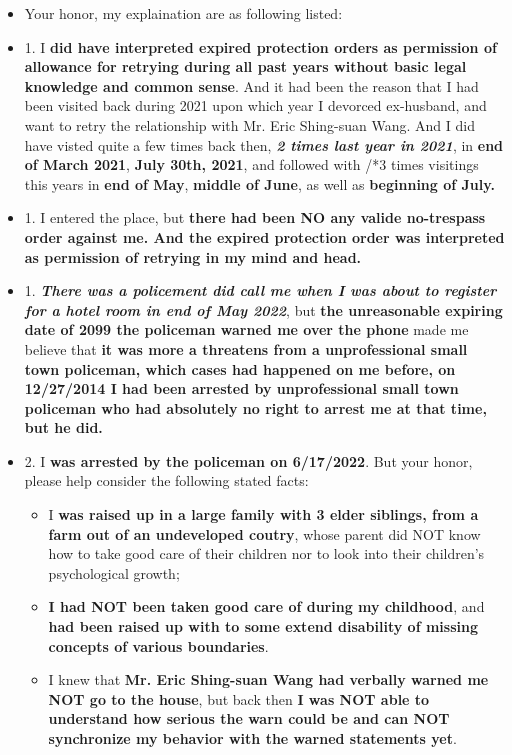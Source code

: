 \documentclass[9pt, b5paper]{article}
\begin{document}
\begin{itemize}
\item Your honor, my explaination are as following listed:
\item 1. I \textbf{did have interpreted expired protection orders as permission of allowance for retrying during all past years without basic legal knowledge and common sense}. And it had been the reason that I had been visited back during 2021 upon which year I devorced ex-husband, and want to retry the relationship with Mr. Eric Shing-suan Wang. And I did have visted quite a few times back then, \emph{\textbf{2 times last year in 2021}}, in \textbf{end of March 2021}, \textbf{July 30th, 2021}, and followed with /*3 times visitings this years in \textbf{end of May}, \textbf{middle of June}, as well as \textbf{beginning of July.}
\item 1. I entered the place, but \textbf{there had been NO any valide no-trespass order against me. And the expired protection order was interpreted as permission of retrying in my mind and head.}
\item 1. \emph{\textbf{There was a policement did call me when I was about to register for a hotel room in end of May 2022}}, but \textbf{the unreasonable expiring date of 2099 the policeman warned me over the phone} made me believe that \textbf{it was more a threatens from a unprofessional small town policeman, which cases had happened on me before, on 12/27/2014 I had been arrested by unprofessional small town policeman who had absolutely no right to arrest me at that time, but he did.}
\item 2. I \textbf{was arrested by the policeman on 6/17/2022}. But your honor, please help consider the following stated facts:
\begin{itemize}
\item I \textbf{was raised up in a large family with 3 elder siblings, from a farm out of an undeveloped coutry}, whose parent did NOT know how to take good care of their children nor to look into their children's psychological growth;
\item \textbf{I had NOT been taken good care of during my childhood}, and \textbf{had been raised up with to some extend disability of missing concepts of various boundaries}.
\item I knew that \textbf{Mr. Eric Shing-suan Wang had verbally warned me NOT go to the house}, but back then \textbf{I was NOT able to understand how serious the warn could be and can NOT synchronize my behavior with the warned statements yet}.

\end{itemize}
\end{itemize}
\end{document}
